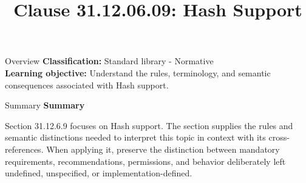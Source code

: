 \documentclass[10pt,letterpaper]{article}
\title{Clause 31.12.06.09: Hash Support}
\author{}
\date{}
\begin{document}
\maketitle
\begin{CornellOverviewBox}{Overview}
\textbf{Classification:} Standard library - Normative\\[2pt]
\textbf{Learning objective:} Understand the rules, terminology, and semantic consequences associated with Hash support.
\end{CornellOverviewBox}\begin{CornellSummaryBox}{Summary}
{\sffamily\bfseries\color{Accent} Summary}\par\vspace{3pt}Section 31.12.6.9 focuses on Hash support. The section supplies the rules and semantic distinctions needed to interpret this topic in context with its cross-references. When applying it, preserve the distinction between mandatory requirements, recommendations, permissions, and behavior deliberately left undefined, unspecified, or implementation-defined.
\end{CornellSummaryBox}
\end{document}
